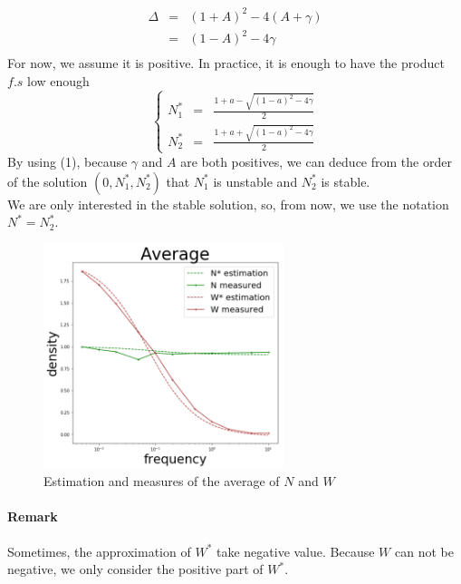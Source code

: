 \documentclass{article}
\begin{document}
\[
\begin{array}{rcl}
\Delta & = & (1+A)^2 - 4(A+\gamma) \\
& = & (1-A)^2 - 4\gamma \\
\end{array}
\]
For now, we assume it is positive. %
In practice, it is enough to have the product $f.s$ low enough %
\[
\left\lbrace
\begin{array}{rcl}
N_1^* & = & \frac{1+a-\sqrt{(1-a)^2-4\gamma}}{2} \\
N_2^* & = & \frac{1+a+\sqrt{(1-a)^2-4\gamma}}{2}
\end{array}
\right.
\]
By using (1), because $\gamma$ and $A$ are both positives, we can deduce from the order of the solution $(0, N_1^*, N_2^*)$ that $N_1^*$ is unstable and $N_2^*$ is stable. 
\\
We are only interested in the stable solution, so, from now, we use the notation $N^* = N_2^*$.



\begin{figure}[h!]
\centering
\includegraphics[width=7cm]{average.png}
\caption{Estimation and measures of the average of $N$ and $W$}
\end{figure}

\paragraph{Remark}
Sometimes, the approximation of $W^*$ take negative value. Because $W$ can not be negative, we only consider the positive part of $W^*$.




\end{document}
